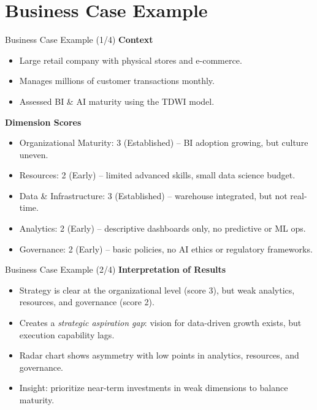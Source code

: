\documentclass[aspectratio=169, table]{beamer}
\begin{document}
\section{Business Case Example}

\begin{frame}{Business Case Example (1/4)}
	\vspace{20pt}
	\textbf{Context}
	\begin{itemize}
		\item Large retail company with physical stores and e-commerce.  
		\item Manages millions of customer transactions monthly.  
		\item Assessed BI \& AI maturity using the TDWI model.  
	\end{itemize}
	
	\textbf{Dimension Scores}
	\begin{itemize}
		\item Organizational Maturity: 3 (Established) – BI adoption growing, but culture uneven.  
		\item Resources: 2 (Early) – limited advanced skills, small data science budget.  
		\item Data \& Infrastructure: 3 (Established) – warehouse integrated, but not real-time.  
		\item Analytics: 2 (Early) – descriptive dashboards only, no predictive or ML ops.  
		\item Governance: 2 (Early) – basic policies, no AI ethics or regulatory frameworks.  
	\end{itemize}
\end{frame}

\begin{frame}{Business Case Example (2/4)}
	\vspace{20pt}
	\textbf{Interpretation of Results}
	\begin{itemize}
		\item Strategy is clear at the organizational level (score 3), but weak analytics, resources, and governance (score 2).  
		\item Creates a \textit{strategic aspiration gap}: vision for data-driven growth exists, but execution capability lags.  
		\item Radar chart shows asymmetry with low points in analytics, resources, and governance.  
		\item Insight: prioritize near-term investments in weak dimensions to balance maturity.  
	\end{itemize}
\end{frame}
\end{document}
